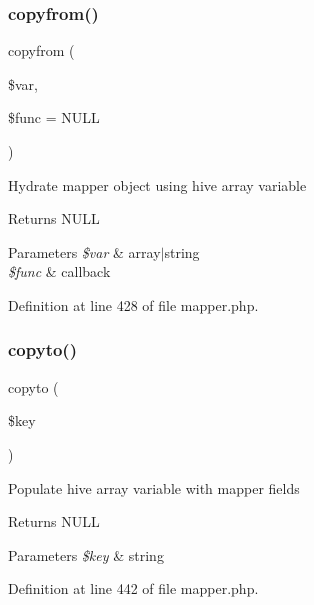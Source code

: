 \subsubsection{\texorpdfstring{copyfrom()}{copyfrom()}}
{\footnotesize\ttfamily copyfrom (\begin{DoxyParamCaption}\item[{}]{\$var,  }\item[{}]{\$func = {\ttfamily NULL} }\end{DoxyParamCaption})}

Hydrate mapper object using hive array variable \begin{DoxyReturn}{Returns}
N\+U\+LL 
\end{DoxyReturn}

\begin{DoxyParams}{Parameters}
{\em \$var} & array$\vert$string \\
\hline
{\em \$func} & callback \\
\hline
\end{DoxyParams}


Definition at line 428 of file mapper.\+php.

\hypertarget{class_d_b_1_1_jig_1_1_mapper_a4bcf54f913758fb093c35ea81fc29615}{}\label{class_d_b_1_1_jig_1_1_mapper_a4bcf54f913758fb093c35ea81fc29615} 
\subsubsection{\texorpdfstring{copyto()}{copyto()}}
{\footnotesize\ttfamily copyto (\begin{DoxyParamCaption}\item[{}]{\$key }\end{DoxyParamCaption})}

Populate hive array variable with mapper fields \begin{DoxyReturn}{Returns}
N\+U\+LL 
\end{DoxyReturn}

\begin{DoxyParams}{Parameters}
{\em \$key} & string \\
\hline
\end{DoxyParams}


Definition at line 442 of file mapper.\+php.

\hypertarget{class_d_b_1_1_jig_1_1_mapper_ab1f3a3bd85dca49dceaea57f2fe21abf}{}\label{class_d_b_1_1_jig_1_1_mapper_ab1f3a3bd85dca49dceaea57f2fe21abf} 
